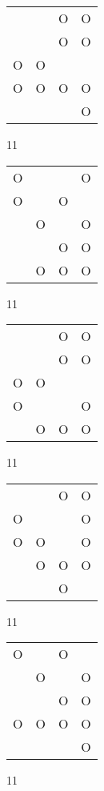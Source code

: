 \begin{tabular}{|m{0.2cm}m{0.2cm}m{0.2cm}m{0.2cm}|}\hline
 & &O&O\\
 & &O&O\\
O&O& & \\
O&O&O&O\\
 & & &O\\
\hline\end{tabular}11
\begin{tabular}{|m{0.2cm}m{0.2cm}m{0.2cm}m{0.2cm}|}\hline
O& & &O\\
O& &O& \\
 &O& &O\\
 & &O&O\\
 &O&O&O\\
\hline\end{tabular}11
\begin{tabular}{|m{0.2cm}m{0.2cm}m{0.2cm}m{0.2cm}|}\hline
 & &O&O\\
 & &O&O\\
O&O& & \\
O& & &O\\
 &O&O&O\\
\hline\end{tabular}11
\begin{tabular}{|m{0.2cm}m{0.2cm}m{0.2cm}m{0.2cm}|}\hline
 & &O&O\\
O& & &O\\
O&O& &O\\
 &O&O&O\\
 & &O& \\
\hline\end{tabular}11
\begin{tabular}{|m{0.2cm}m{0.2cm}m{0.2cm}m{0.2cm}|}\hline
O& &O& \\
 &O& &O\\
 & &O&O\\
O&O&O&O\\
 & & &O\\
\hline\end{tabular}11
